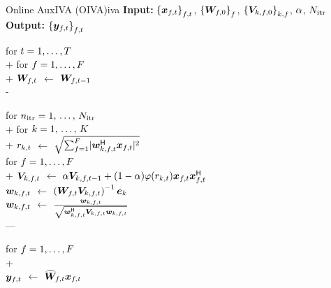 \documentclass[sip,biber]{now-journal}
\begin{document}
\begin{algorithm}{Online AuxIVA (OIVA)}{iva}
  \textbf{Input:} ${\{\Obs _{\ft}\}} _{\ft}$, $ {\{\bm{W} _{f,0}\}} _{f}$, $ {\{\bm{V} _{k,f,0}\}} _{k,f}$, $ \alpha$, $N _{\mathrm{itr}}$\\
  \textbf{Output:} ${\{\Est _{\ft}\}} _{\ft}$
  \begin{pseudo}
    for $t = 1, \dots, T$ \\+
      for $f = 1, \dots, F$ \\+
        {$\Demix _{\ft}$} $\gets$ $\Demix _{\ft[-1]}$ \\-

      for $n _{\mathrm{itr}} = 1,\, \dots,\, N _{\mathrm{itr}}$ \\+
        for $k = 1,\, \dots,\, K$ \\+
          {$r _{k,t}$} $\gets$ $\sqrt{\sum _{\freq = 1} ^{\Freq} \abs{\demix _{\src,\ft} ^{\hermite} \Obs _{\ft}} ^2}$ \ct{\eqref{eq:var}} \\
          for $f = 1, \dots, F$ \\+
            {$\cov _{\src,\ft}    $} $\gets$ $\forget \cov _{\src,\ft[-1]} + (1 - \forget) \weight(\var _{\src,\tframe}) \Obs _{\ft} \Obs _{\ft} ^{\hermite}$ \ct{\eqref{eq:cov}} \\
            {$\demix _{\src,\ft}$} $\gets$ $\left(\Demix _{\ft} \cov _{\src,\ft}\right) ^{-1} \eye _{\src}$ \ct{\eqref{eq:ip:proj}} \\
            {$\demix _{\src,\ft}$} $\gets$ $\frac{\demix _{\src,\ft}}{\sqrt{\demix _{\src,\ft} ^{\hermite} \cov _{\src,\ft} \demix _{\src,\ft}}}$ \ct{\eqref{eq:ip:norm}} \\---

      for $f = 1, \dots, F$ \\+
         \ct{\eqref{eq:pb:w}}\\
        {$\Est _{\ft}$} $\gets$ $\proj{\Demix }_{\ft} \Obs _{\ft}$ \ct{\eqref{eq:pb:y}}
  \end{pseudo}
\end{algorithm}
\end{document}
